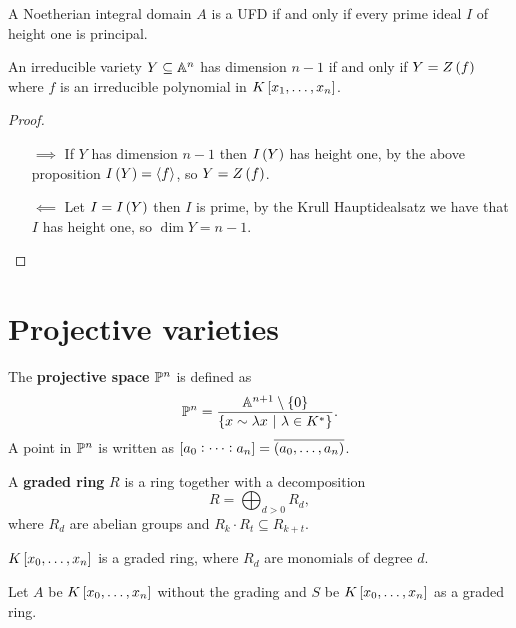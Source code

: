 
\begin{proposition}
A Noetherian integral domain $ A $ is a UFD if and only if every prime ideal $ I $ of height one is principal.
\end{proposition}

\begin{theorem}
An irreducible variety $ Y \subseteq \AA^n $ has dimension $ n - 1 $ if and only if $ Y = Z\br{f} $ where $ f $ is an irreducible polynomial in $ K\sbr{x_1, \dots, x_n} $.
\end{theorem}

\begin{proof}
\hfill
\begin{itemize}
\item[$ \implies $] If $ Y $ has dimension $ n - 1 $ then $ I\br{Y} $ has height one, by the above proposition $ I\br{Y} = \abr{f} $, so $ Y = Z\br{f} $.
\item[$ \impliedby $] Let $ I = I\br{Y} $ then $ I $ is prime, by the Krull Hauptidealsatz we have that $ I $ has height one, so $ \dim Y = n - 1 $.
\end{itemize}
\end{proof}

\pagebreak

\section{Projective varieties}

\begin{definition}
The \textbf{projective space} $ \PP^n $ is defined as
$$ \PP^n = \dfrac{\AA^{n + 1} \setminus \cbr{0}}{\cbr{x \sim \lambda x \st \lambda \in K^*}}. $$
A point in $ \PP^n $ is written as $ \sbr{a_0 : \dots : a_n} = \overline{\br{a_0, \dots, a_n}} $.
\end{definition}

\begin{definition}
A \textbf{graded ring} $ R $ is a ring together with a decomposition
$$ R = \bigoplus_{d > 0} R_d, $$
where $ R_d $ are abelian groups and $ R_k \cdot R_t \subseteq R_{k + t} $.
\end{definition}

\begin{example}
$ K\sbr{x_0, \dots, x_n} $ is a graded ring, where $ R_d $ are monomials of degree $ d $.
\end{example}

\begin{notation}
Let $ A $ be $ K\sbr{x_0, \dots, x_n} $ without the grading and $ S $ be $ K\sbr{x_0, \dots, x_n} $ as a graded ring.
\end{notation}


